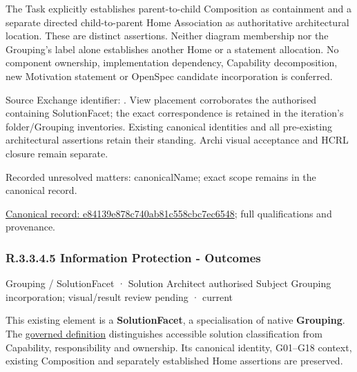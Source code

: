The Task explicitly establishes parent-to-child Composition as containment and
a separate directed child-to-parent Home Association as authoritative architectural
location. These are distinct assertions. Neither diagram membership nor the
Grouping's label alone establishes another Home or a statement allocation.
No component ownership, implementation dependency, Capability decomposition,
new Motivation statement or OpenSpec candidate incorporation is conferred.



Source Exchange identifier: \texttt{}. View placement corroborates
the authorised containing SolutionFacet; the exact correspondence is retained in the
iteration's folder/Grouping inventories. Existing canonical identities and all
pre-existing architectural assertions retain their standing. Archi visual
acceptance and HCRL closure remain separate.


{\small Recorded unresolved matters: canonicalName; exact scope remains in the canonical record.}\par
{\footnotesize \href{../../../../../../../continuum/grouping/e84139e878c740ab81c558cbc7ec6548.md}{Canonical record: e84139e878c740ab81c558cbc7ec6548}; full qualifications and provenance.}\par
\subsubsection*{R.3.3.4.5 Information Protection - Outcomes}
\label{navigation:R.3.3.4.5}

\label{element:b6ff7b82c59e4125868902e34d89630d}
{\small Grouping / SolutionFacet · Solution Architect authorised Subject Grouping incorporation; visual/result review pending · current}\par

This existing element is a \textbf{SolutionFacet}, a specialisation of native
\textbf{Grouping}. The \href{\detokenize{../../../../../../../governance/continuum-representation.md#solutionfacet-classification--1119-candidate}}{governed definition}
distinguishes accessible solution classification from Capability, responsibility
and ownership. Its canonical identity, G01–G18 context, existing Composition
and separately established Home assertions are preserved.



